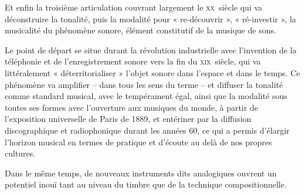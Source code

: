 \bigskip

Et enfin la troisième articulation couvrant largement le \textsc{xx}\ieme ~siècle qui va déconstruire %
la tonalité, puis la modalité pour « re-découvrir », « ré-investir », la musicalité du phénomène sonore, élément constitutif de la musique de sons. 

Le point de départ se situe durant la révolution industrielle avec l'invention de la téléphonie et de l'enregistrement sonore vers la fin du \textsc{xix}\ieme ~siècle, qui va littéralement « déterritorialiser » l'objet sonore dans l'espace et dans le temps. Ce phénomène va amplifier -- dans tous les sens du terme -- et diffuser la tonalité comme standard musical, avec le tempérament égal, ainsi que la modalité sous toutes ses formes avec l’ouverture aux musiques du monde, à partir de l’exposition universelle de Paris de 1889, et entériner par la diffusion discographique et radiophonique durant les années 60, ce qui a permis d’élargir l’horizon musical en termes de pratique et d’écoute au delà de nos propres cultures. 

Dans le même temps, de nouveaux instruments dits analogiques ouvrent un potentiel inouï tant au niveau du timbre que de la technique compositionnelle.

